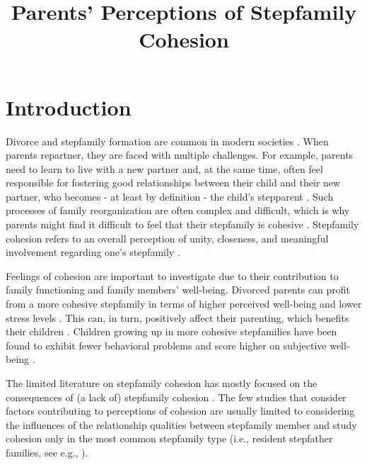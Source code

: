 \documentclass[\pandocDocMode,longtable,floatsintext]{apa6}
\title{Parents' Perceptions of Stepfamily Cohesion}
\affiliation{Utrecht University}
\begin{document}
\maketitle

\hypertarget{introduction}{%
\section{Introduction}\label{introduction}}

Divorce and stepfamily formation are common in modern societies
\autocite{raley_divorce_2020}. When parents repartner, they are faced
with multiple challenges. For example, parents need to learn to live
with a new partner and, at the same time, often feel responsible for
fostering good relationships between their child and their new partner,
who becomes - at least by definition - the child's stepparent
\autocite{jensen2017transitioning}. Such processes of family
reorganization are often complex and difficult, which is why parents
might find it difficult to feel that their stepfamily is cohesive
\autocite[ \textcite{pink1985problem}
\textcite{waldren1990cohesion}]{ganong2019stepfathers}. Stepfamily
cohesion refers to an overall perception of unity, closeness, and
meaningful involvement regarding one's stepfamily \autocite[
\textcite{waldren1990cohesion}
\textcite{jensen2022associations}]{komter2006strength}.

Feelings of cohesion are important to investigate due to their
contribution to family functioning and family members' well-being.
Divorced parents can profit from a more cohesive stepfamily in terms of
higher perceived well-being and lower stress levels
\autocite{waldren1990cohesion}. This can, in turn, positively affect
their parenting, which benefits their children
\autocite{king2015adolescents}. Children growing up in more cohesive
stepfamilies have been found to exhibit fewer behavioral problems and
score higher on subjective well-being \autocite{shigeto2014roles}.

The limited literature on stepfamily cohesion has mostly focused on the
consequences of (a lack of) stepfamily cohesion \autocite[e.g.,][
\textcite{hong2015interactive}
\textcite{shigeto2014roles}]{duncan1994effects}. The few studies that
consider factors contributing to perceptions of cohesion are usually
limited to considering the influences of the relationship qualities
between stepfamily member \autocite[e.g.,][]{jensen2022associations} and
study cohesion only in the most common stepfamily type (i.e., resident
stepfather families, see e.g., \textcite{favez2015coparenting}
\textcite{jensen2022associations}).
\end{document}
